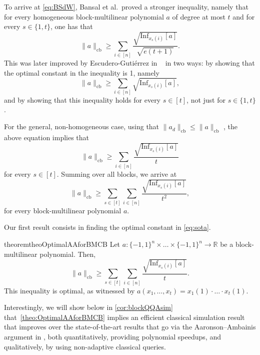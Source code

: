 \documentclass[11pt]{article}
\DeclareMathOperator{\cb}{cb}
\newcommand{\norm}[1]{\|#1\|}
\newcommand{\R}{\mathbb{R}} %
\newcommand{\1}{\mathbf{1}}
\newcommand\Inf{\mathrm{Inf}}
\theoremstyle{plain}
\theoremstyle{definition}
\theoremstyle{remark}
\begin{document}
To arrive at \cref{eq:BSdW}, Bansal et al.\ proved a stronger inequality, namely that for every homogeneous block-multilinear polynomial $a$ of degree at most $t$ and for every $s\in \{1,t\}$, one has that 
\begin{equation*}
    \norm{a}_{\cb}\geq \sum_{i\in [n]}\frac{\sqrt{\Inf_{x_s(i)}[a]}}{\sqrt{e(t+1)}}.
\end{equation*}
This was later improved by Escudero-Gutiérrez in ~\cite{gutierrez2023influences} in two ways: by showing that the optimal constant in the inequality is 1, namely 
\begin{equation*}
    \norm{a}_{\cb}\geq \sum_{i\in [n]}\sqrt{\Inf_{x_s(i)}[a]},
\end{equation*}and by showing that this inequality holds for every $s\in [t]$, not just for $s\in\{1,t\}$. 

For the general, non-homogeneous case, using that $\norm{a_{d}}_{\cb}\leq \norm{a}_{\cb}$ \cite[Eq. (22)]{gutierrez2023influences}, the above equation implies that 
\begin{equation*}
    \norm{a}_{\cb}\geq \sum_{i\in [n]}\frac{\sqrt{\Inf_{x_s(i)}[a]}}{t}
\end{equation*}for every $s\in [t]$. Summing over all blocks, we arrive at 
 \begin{equation}\label{eq:sota}
    \norm{a}_{\cb}\geq \sum_{s\in [t]}\sum_{i\in [n]}\frac{\sqrt{\Inf_{x_s(i)}[a]}}{t^2},
\end{equation}
for every block-multilinear polynomial $a$. 

Our first result consists in finding the optimal constant in \cref{eq:sota}. 

\begin{restatable}{theorem}{theoOptimalAAforBMCB}\label{theo:OptimalAAforBMCB}
    Let $a:\{-1,1\}^n\times\dots\times \{-1,1\}^n\to \R$ be a block-multilinear polynomial. Then, 
    \begin{equation*}
     \norm{a}_{\cb}\geq \sum_{s\in [t]}\sum_{i\in [n]}\frac{\sqrt{\Inf_{x_s(i)}[a]}}{t}.
\end{equation*}
    This inequality is optimal, as witnessed by $a(x_1,\dots,x_t)=x_1(1)\cdot\dots\cdot x_t(1).$
\end{restatable}

Interestingly, we will show below in \cref{cor:blockQQAsim} that~\cref{theo:OptimalAAforBMCB} implies an efficient classical simulation result that improves over the state-of-the-art results that go via the Aaronson--Ambainis argument in \cite[Theorem 22]{Aaronsons:2014}, both quantitatively, providing polynomial speedups, and qualitatively, by using non-adaptive classical queries. 
\end{document}
